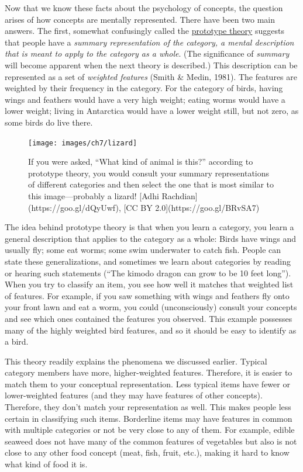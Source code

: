 \documentclass[
]{krantz}
\begin{document}
Now that we know these facts about the psychology of concepts, the question arises of how concepts are mentally represented. There have been two main answers. The first, somewhat confusingly called the \hyperref[prototype-theory]{prototype theory} suggests that people have a \emph{summary representation of the category, a mental description that is meant to apply to the category as a whole}. (The significance of \emph{summary} will become apparent when the next theory is described.) This description can be represented as a set of \emph{weighted features} (Smith \& Medin, 1981). The features are weighted by their frequency in the category. For the category of birds, having wings and feathers would have a very high weight; eating worms would have a lower weight; living in Antarctica would have a lower weight still, but not zero, as some birds do live there.

\begin{figure}

{\centering \texttt{[image: images/ch7/lizard]} 

}

\caption{If you were asked, “What kind of animal is this?” according to prototype theory, you would consult your summary representations of different categories and then select the one that is most similar to this image—probably a lizard! [Adhi Rachdian](https://goo.gl/dQyUwf), [CC BY 2.0](https://goo.gl/BRvSA7)}\label{fig:lizard}
\end{figure}

The idea behind prototype theory is that when you learn a category, you learn a general description that applies to the category as a whole: Birds have wings and usually fly; some eat worms; some swim underwater to catch fish. People can state these generalizations, and sometimes we learn about categories by reading or hearing such statements (``The kimodo dragon can grow to be 10 feet long'').
When you try to classify an item, you see how well it matches that weighted list of features. For example, if you saw something with wings and feathers fly onto your front lawn and eat a worm, you could (unconsciously) consult your concepts and see which ones contained the features you observed. This example possesses many of the highly weighted bird features, and so it should be easy to identify as a bird.

This theory readily explains the phenomena we discussed earlier. Typical category members have more, higher-weighted features. Therefore, it is easier to match them to your conceptual representation. Less typical items have fewer or lower-weighted features (and they may have features of other concepts). Therefore, they don't match your representation as well. This makes people less certain in classifying such items. Borderline items may have features in common with multiple categories or not be very close to any of them. For example, edible seaweed does not have many of the common features of vegetables but also is not close to any other food concept (meat, fish, fruit, etc.), making it hard to know what kind of food it is.
\end{document}
